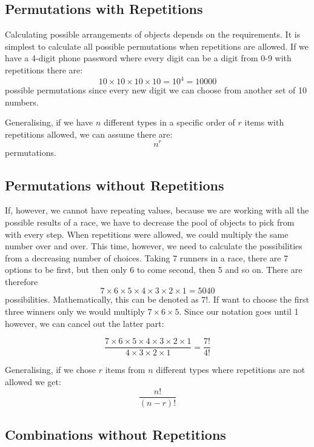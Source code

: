 \documentclass[12pt, a4paper]{article}   %
\begin{document}
\subsection{Permutations with Repetitions}

Calculating possible arrangements of objects depends on the requirements. It is simplest to calculate all possible permutations when repetitions are allowed. If we have a 4-digit phone password where every digit can be a digit from 0-9 with repetitions there are: \[ 10 \times 10 \times 10 \times 10 = 10^{4} = 10000 \] possible permutations since every new digit we can choose from another set of 10 numbers. 

Generalising, if we have \(n\) different types in a specific order of \(r\) items with repetitions allowed, we can assume there are: 
\begin{equation} \label{eq:permutations-with-repetition}
n^{r}
\end{equation}
permutations.

\subsection{Permutations without Repetitions}

If, however, we cannot have repeating values, because we are working with all the possible results of a race, we have to decrease the pool of objects to pick from with every step. When repetitions were allowed, we could multiply the same number over and over. This time, however, we need to calculate the possibilities from a decreasing number of choices. Taking 7 runners in a race, there are 7 options to be first, but then only 6 to come second, then 5 and so on. There are therefore \[7 \times 6 \times 5 \times 4 \times 3 \times 2 \times 1 = 5040\] possibilities. Mathematically, this can be denoted as \(7!\). If want to choose the first three winners only we would multiply \(7 \times 6 \times 5\). Since our notation goes until 1 however, we can cancel out the latter part: 

\[ \frac{7 \times 6 \times 5 \times 4 \times 3 \times 2 \times 1}{4 \times 3 \times 2 \times 1} = \frac{7!}{4!}\]

Generalising, if we chose \(r\) items from \(n\) different types where repetitions are not allowed we get:
\begin{equation} \label{eq:permutations-without-repetition}
\frac{n!}{(n-r)!}
\end{equation} 

\subsection{Combinations without Repetitions}
\end{document}
